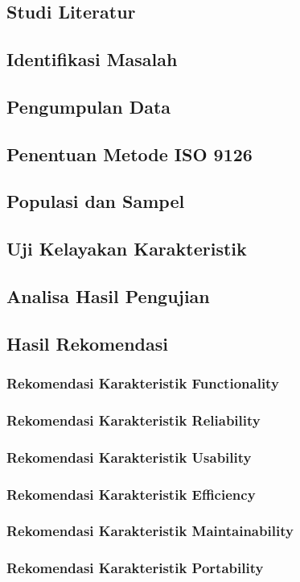 %
%
%
%


\chapter{\babEmpat}
\section{Studi Literatur}
\section{Identifikasi Masalah}
\section{Pengumpulan Data}
\section{Penentuan Metode ISO 9126}
\section{Populasi dan Sampel}
\section{Uji Kelayakan Karakteristik}
\section{Analisa Hasil Pengujian}
\section{Hasil Rekomendasi}
\subsection{Rekomendasi Karakteristik Functionality}
\subsection{Rekomendasi Karakteristik Reliability}
\subsection{Rekomendasi Karakteristik Usability}
\subsection{Rekomendasi Karakteristik Efficiency}
\subsection{Rekomendasi Karakteristik Maintainability}
\subsection{Rekomendasi Karakteristik Portability}